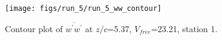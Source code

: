 \begin{figure}[H]
\centering
\texttt{[image: figs/run\_5/run\_5\_ww\_contour]}
\caption{Contour plot of $\overline{w^\prime w^\prime}$ at $z/c$=5.37, $V_{free}$=23.21, station 1.}
\label{fig:run_5_ww_contour}
\end{figure}


